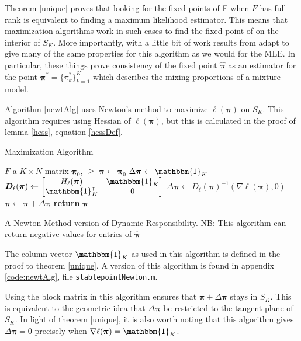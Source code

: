 \label{respMLE}

Theorem \ref{unique} proves that looking for the fixed points of \Rpi F when $F$ has full rank is equivalent to finding a maximum likelihood estimator. This means that maximization algorithms work in such cases to find the fixed point of  on the interior of $S_K$.  More importantly, with a little bit of work results from \citep{WaldMLE, pollard1981, pollard1982} adapt to give many of the same properties for this algorithm as we would for the MLE.  In particular, these things prove consistency of the fixed point $\hat{\bm\pi}$ as an estimator for the point $\bm\pi^\ast=\{\pi_k^\ast\}_{k=1}^{K}$ which describes the mixing proportions of a mixture model.

Algorithm \ref{newtAlg} uses Newton's method to maximize $\ell(\bm\pi)$ on $S_K$. This algorithm requires using Hessian of $\ell(\bm\pi)$, but this is calculated in the proof of lemma \ref{hess}, equation \eqref{hessDef}.

\begin{table}[h]
\begin{algorithm}[H]
\caption{Maximization Algorithm}\label{newtAlg}
\begin{algorithmic}
\Require $F$ a $K\times N$ matrix
\Require $\bm\pi_0$, $\ge$
	\State $\bm\pi \gets \bm\pi_0$
	\State $\Delta\bm\pi \gets \mathbbm{1}_K$
	\While{$\lVert\Delta\bm\pi\rVert>\ge\lVert\bm\pi\rVert$}
		\State $\bm D_{\ell}(\bm\pi) \gets \Matrix{H_{\ell}(\bm\pi)&\mathbbm{1}_K\\ \mathbbm{1}_K^{\intercal}& 0 }$
		\State $\Delta\bm\pi \gets D_{\ell}(\bm\pi)^{-1}(\nabla\ell(\bm\pi),0)$
		\State $\bm\pi \gets \bm\pi + \Delta\bm\pi$
	\EndWhile
	\State \textbf{return} $\bm\pi$ 
\EndProcedure
\end{algorithmic}
\end{algorithm}
\caption[A Newton Method version of Dynamic Responsibility]{A Newton Method version of Dynamic Responsibility. NB: This algorithm can return negative values for entries of \(\hat{\bm \pi}\)}
\end{table}
The column vector $\mathbbm{1}_K$ as used in this algorithm is defined in the proof to theorem \ref{unique}.  A version of this algorithm is found in appendix \ref{code:newtAlg}, file \verb|stablepointNewton.m|.

Using the block matrix in this algorithm ensures that $\bm\pi+\Delta\bm\pi$ stays in $S_K$.  This is equivalent to the geometric idea that $\Delta\bm\pi$ be restricted to the tangent plane of $S_K$.  In light of theorem \ref{unique}, it is also worth noting that this algorithm gives $\Delta\bm\pi=0$ precisely when $\nabla\ell(\bm\pi)=\mathbbm{1}_K$.

